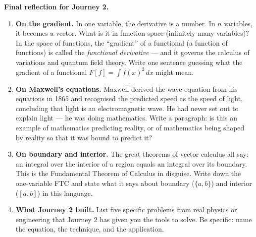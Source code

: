 \documentclass[12pt, a4paper]{article}
\newcounter{problem}
\begin{document}
\begin{reflectionbox}
\textbf{Final reflection for Journey 2.}

\begin{enumerate}
  \item \textbf{On the gradient.} In one variable, the derivative is a number. In $n$ variables, it becomes a vector. What is it in function space (infinitely many variables)? In the space of functions, the ``gradient'' of a functional (a function of functions) is called the \emph{functional derivative} --- and it governs the calculus of variations and quantum field theory. Write one sentence guessing what the gradient of a functional $F[f] = \int f(x)^2\,dx$ might mean.

  \item \textbf{On Maxwell's equations.} Maxwell derived the wave equation from his equations in 1865 and recognised the predicted speed as the speed of light, concluding that light is an electromagnetic wave. He had never set out to explain light --- he was doing mathematics. Write a paragraph: is this an example of mathematics predicting reality, or of mathematics being shaped by reality so that it was bound to predict it?

  \item \textbf{On boundary and interior.} The great theorems of vector calculus all say: an integral over the interior of a region equals an integral over its boundary. This is the Fundamental Theorem of Calculus in disguise. Write down the one-variable FTC and state what it says about boundary ($\{a, b\}$) and interior ($[a,b]$) in this language.

  \item \textbf{What Journey 2 built.} List five specific problems from real physics or engineering that Journey 2 has given you the tools to solve. Be specific: name the equation, the technique, and the application.
\end{enumerate}
\end{reflectionbox}

\medskip
\end{document}
